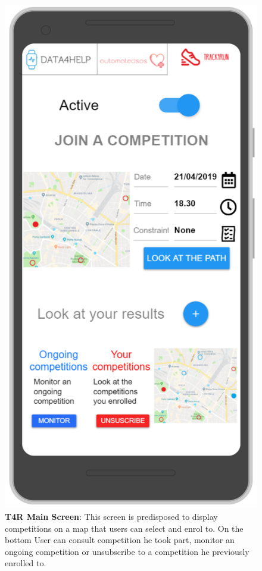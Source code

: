 \begin{figure}[H]
\centering
\includegraphics[scale = 0.5]{Mocks/Mobile_T4R_Main.PNG}
\caption{\textbf{T4R Main Screen}: This screen is predisposed to display competitions on a map that users can select and enrol to. On the bottom User can consult competition he took part, monitor an ongoing competition or unsubscribe to a competition he previously enrolled to. }
\end{figure}


